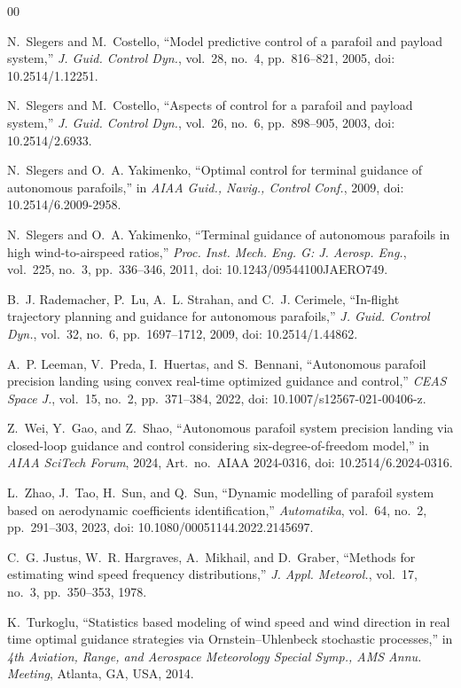 \documentclass[conference]{IEEEtran}
\begin{document}
\begin{thebibliography}{00}

N.~Slegers and M.~Costello, ``Model predictive control of a parafoil and payload system,'' \emph{J. Guid. Control Dyn.}, vol.~28, no.~4, pp.~816--821, 2005, doi: 10.2514/1.12251.

N.~Slegers and M.~Costello, ``Aspects of control for a parafoil and payload system,'' \emph{J. Guid. Control Dyn.}, vol.~26, no.~6, pp.~898--905, 2003, doi: 10.2514/2.6933.

N.~Slegers and O.~A. Yakimenko, ``Optimal control for terminal guidance of autonomous parafoils,'' in \emph{AIAA Guid., Navig., Control Conf.}, 2009, doi: 10.2514/6.2009-2958.

N.~Slegers and O.~A. Yakimenko, ``Terminal guidance of autonomous parafoils in high wind-to-airspeed ratios,'' \emph{Proc. Inst. Mech. Eng. G: J. Aerosp. Eng.}, vol.~225, no.~3, pp.~336--346, 2011, doi: 10.1243/09544100JAERO749.

B.~J. Rademacher, P.~Lu, A.~L. Strahan, and C.~J. Cerimele, ``In-flight trajectory planning and guidance for autonomous parafoils,'' \emph{J. Guid. Control Dyn.}, vol.~32, no.~6, pp.~1697--1712, 2009, doi: 10.2514/1.44862.

A.~P. Leeman, V.~Preda, I.~Huertas, and S.~Bennani, ``Autonomous parafoil precision landing using convex real-time optimized guidance and control,'' \emph{CEAS Space J.}, vol.~15, no.~2, pp.~371--384, 2022, doi: 10.1007/s12567-021-00406-z.

Z.~Wei, Y.~Gao, and Z.~Shao, ``Autonomous parafoil system precision landing via closed-loop guidance and control considering six-degree-of-freedom model,'' in \emph{AIAA SciTech Forum}, 2024, Art.\ no.~AIAA 2024-0316, doi: 10.2514/6.2024-0316.

L.~Zhao, J.~Tao, H.~Sun, and Q.~Sun, ``Dynamic modelling of parafoil system based on aerodynamic coefficients identification,'' \emph{Automatika}, vol.~64, no.~2, pp.~291--303, 2023, doi: 10.1080/00051144.2022.2145697.

C.~G. Justus, W.~R. Hargraves, A.~Mikhail, and D.~Graber, ``Methods for estimating wind speed frequency distributions,'' \emph{J. Appl. Meteorol.}, vol.~17, no.~3, pp.~350--353, 1978.

K.~Turkoglu, ``Statistics based modeling of wind speed and wind direction in real time optimal guidance strategies via Ornstein--Uhlenbeck stochastic processes,'' in \emph{4th Aviation, Range, and Aerospace Meteorology Special Symp., AMS Annu. Meeting}, Atlanta, GA, USA, 2014.


\end{thebibliography}
\end{document}
